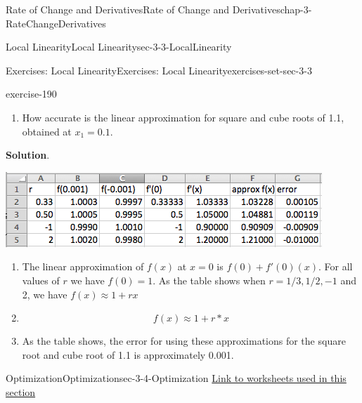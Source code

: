 \documentclass[oneside,10pt,]{book}
\numberwithin{equation}{section}
\begin{document}
\begin{chapterptx}{Rate of Change and Derivatives}{}{Rate of Change and Derivatives}{}{}{chap-3-RateChangeDerivatives}
\begin{sectionptx}{Local Linearity}{}{Local Linearity}{}{}{sec-3-3-LocalLinearity}
\begin{exercises-subsection-numberless}{Exercises: Local Linearity}{}{Exercises: Local Linearity}{}{}{exercises-set-sec-3-3}
\begin{divisionexercise}{11}{}{}{exercise-190}
\begin{enumerate}[label=(\alph*)]
Give a rule for the linear approximation for a general value of r.%
\item\hypertarget{li-381}{}\hypertarget{p-1197}{}%
How accurate is the linear approximation for square and cube roots of 1.1, obtained at \(x_1=0.1\).%
\end{enumerate}
\par\smallskip%
\noindent\textbf{Solution}.\hypertarget{solution-94}{}\quad%
\leavevmode%
\begin{sidebyside}{1}{0.2}{0.2}{0}%
\begin{sbspanel}{0.6}%
\includegraphics[width=1\linewidth]{images/sec3-3-sol11a.png}
\end{sbspanel}%
\end{sidebyside}%
\leavevmode%
\begin{enumerate}[label=(\alph*)]
\item\hypertarget{li-382}{}\hypertarget{p-1198}{}%
The linear approximation of \(f(x)\) at \(x=0\) is \(f(0)+f'(0)(x)\).  For all values of \(r\) we have \(f(0)=1\).  As the table shows when \(r=1/3,1/2,-1\) and 2, we have \(f(x)\approx 1+r x\)%
\item\hypertarget{li-383}{}%
\begin{equation*}
f(x) \approx 1+r*x
\end{equation*}
%
\item\hypertarget{li-384}{}\hypertarget{p-1199}{}%
As the table shows, the error for using these approximations for the square root and cube root of 1.1 is approximately 0.001.%
\end{enumerate}
\end{divisionexercise}%
\end{exercises-subsection-numberless}
\end{sectionptx}
%
%
\typeout{************************************************}
\typeout{************************************************}
%
\begin{sectionptx}{Optimization}{}{Optimization}{}{}{sec-3-4-Optimization}
\hypertarget{p-1200}{}%
\href{./Examples/Section-3-4-Examples.xlsx}{Link to worksheets used in this section}%
\par
\hypertarget{p-1201}{}%

\end{sectionptx}
\end{chapterptx}
\end{document}
